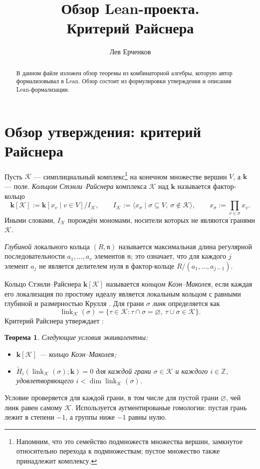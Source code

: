 \documentclass[11pt]{amsart}
\title{Обзор Lean-проекта. \\ \tiny{Критерий Райснера}}
\author{Лев Ерченков}
\date{}
\newtheorem{theorem}{Теорема}[section]
\begin{document}
\begin{abstract}
В данном файле изложен обзор теоремы из комбинаторной алгебры, которую автор
формализовывал в Lean. Обзор состоит из формулировки утверждения и описания
Lean-формализации.
\end{abstract}
\maketitle

\section{Обзор утверждения: критерий Райснера}
Пусть $\mathcal{K}$ — симплициальный комплекс\footnote{Напомним, что это семейство
подмножеств множества вершин, замкнутое относительно перехода к
подмножествам; пустое множество также принадлежит комплексу.} на конечном
множестве вершин $V$, а $\mathbf{k}$ — поле. \textit{Кольцом
Стэнли--Райснера} комплекса $\mathcal{K}$ над $\mathbf{k}$ называется
фактор-кольцо
\[
  \mathbf{k}[\mathcal{K}]
  :=\mathbf{k}[x_v\mid v\in V]/I_{\mathcal{K}},\qquad
  I_{\mathcal{K}}:=\langle x_\sigma\mid \sigma\subseteq V,
      \ \sigma\notin\mathcal{K}\rangle,
  \qquad x_\sigma:=\prod_{v\in\sigma}x_v.
\]
Иными словами, $I_{\mathcal{K}}$ порождён мономами,
носители которых не являются гранями $\mathcal{K}$.

\textit{Глубиной} локального кольца $(R,\mathfrak n)$ называется максимальная длина
регулярной последовательности $a_1,\ldots,a_r$ элементов $\mathfrak n$;
это означает, что для каждого $j$ элемент $a_j$ не является делителем нуля
в фактор-кольце $R/(a_1,\ldots,a_{j-1})$.

Кольцо Стэнли--Райснера $\mathbf{k}[\mathcal{K}]$ называется
\textit{кольцом Коэн--Маколея}, если каждая его
локализация по простому идеалу является локальным кольцом с равными глубиной
и размерностью Крулля \cite[Definitions~10.103.1 and 10.104.6]{Stacks}.
Для грани $\sigma$ \textit{линк} определяется как
\[
  \operatorname{link}_{\mathcal{K}}(\sigma)
  =\{\tau\in\mathcal{K}: \tau\cap\sigma=\varnothing,
                    \ \tau\cup\sigma\in\mathcal{K}\}.
\]
Критерий Райснера утверждает \cite[Theorem~2.5]{Panov}:
\begin{theorem}
Следующие условия эквивалентны:
\begin{itemize}
  \item $\mathbf{k}[\mathcal{K}]$ — кольцо Коэн--Маколея;
  \item $\widetilde H_i(\operatorname{link}_{\mathcal{K}}(\sigma);\mathbf{k})=0$
    для каждой грани $\sigma\in\mathcal{K}$ и каждого $i\in\mathbb Z$,
    удовлетворяющего $i<\dim\operatorname{link}_{\mathcal{K}}(\sigma)$.
\end{itemize}
\end{theorem}
Условие проверяется для каждой грани, в том числе для пустой грани
$\varnothing$, чей линк равен самому $\mathcal{K}$. Используется
аугментированые гомологии: пустая грань лежит в степени $-1$, а группы
ниже $-1$ равны нулю.
\end{document}
